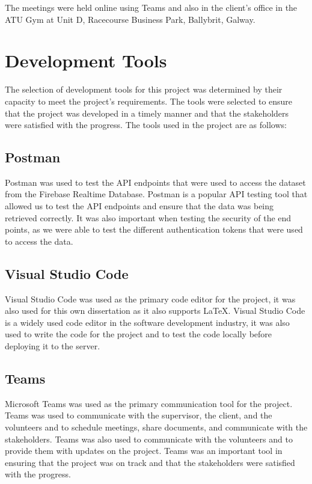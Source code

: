 The meetings were held online using Teams and also in the client's office in the ATU Gym at Unit D, Racecourse Business Park, Ballybrit, Galway. 


\section{Development Tools}
The selection of development tools for this project was determined by their capacity to meet the project's requirements.
The tools were selected to ensure that the project was developed in a timely manner and that the stakeholders were satisfied with the progress. 
The tools used in the project are as follows:

\subsection{Postman}
Postman was used to test the API endpoints that were used to access the dataset from the Firebase Realtime Database. Postman is a popular API testing tool
that allowed us to test the API endpoints and ensure that the data was being retrieved correctly. It was also important when testing the security of the end points, 
as we were able to test the different authentication tokens that were used to access the data.

\subsection{Visual Studio Code}
Visual Studio Code was used as the primary code editor for the project, it was also used for this own dissertation as it also supports \LaTeX. Visual Studio Code 
is a widely used code editor in the software development industry, it was also used to write the code for the project and to test the 
code locally before deploying it to the server.


\subsection{Teams}
Microsoft Teams was used as the primary communication tool for the project. Teams was used to communicate with the supervisor, the client, and the volunteers and to 
schedule meetings, share documents, and communicate with the stakeholders. Teams was also used to communicate with the volunteers and to provide them
with updates on the project. Teams was an important tool in ensuring that the project was on track and that the stakeholders were satisfied with the progress.

